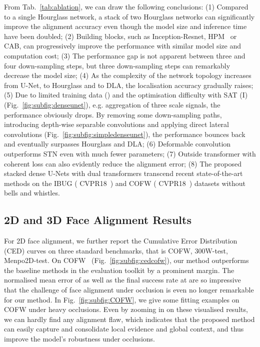 \documentclass{bmvc2k}
\begin{document}
From Tab.~\ref{tab:ablation}, we can draw the following conclusions: (1) Compared to a single Hourglass network, a stack of two Hourglass networks can significantly improve the alignment accuracy even though the model size and inference time have been doubled; (2) Building blocks, such as Inception-Resnet, HPM~\cite{bulat2017far} or CAB, can progressively improve the performance with similar model size and computation cost; (3) The performance gap is not apparent between three and four down-sampling steps, but three down-sampling steps can remarkably decrease the model size; (4) As the complexity of the network topology increases from U-Net, to Hourglass and to DLA, the localisation accuracy gradually raises; (5) Due to limited training data () and the optimisation difficulty with SAT (I) (Fig.~\ref{fig:subfig:denseunet}), e.g. aggregation of three scale signals, the performance obviously drops. By removing some down-sampling paths, introducing depth-wise separable convolutions and applying direct lateral convolutions (Fig.~\ref{fig:subfig:simpledenseunet}), the performance bounces back and eventually surpasses Hourglass and DLA; (6) Deformable convolution outperforms STN even with much fewer parameters; (7) Outside transformer with coherent loss can also evidently reduce the alignment error; (8) The proposed stacked dense U-Nets with dual transformers transcend recent state-of-the-art methods on the IBUG ( CVPR18~\cite{feng2017wing}) and COFW ( CVPR18~\cite{kumar2018disentangling}) datasets without bells and whistles.

\subsection{2D and 3D Face Alignment Results}

For 2D face alignment, we further report the Cumulative Error Distribution (CED) curves on three standard benchmarks, that is COFW, 300W-test, Menpo2D-test. On COFW~\cite{burgos2013robust} (Fig.~\ref{fig:subfig:cedcofw}), our method outperforms the baseline methods in the evaluation toolkit by a prominent margin. The normalised mean error of  as well as the final success rate at  are so impressive that the challenge of face alignment under occlusion is even no longer remarkable for our method. In Fig.~\ref{fig:subfig:COFW}, we give some fitting examples on COFW under heavy occlusions. Even by zooming in on these visualised results, we can hardly find any alignment flaw, which indicates that the proposed method can easily capture and consolidate local evidence and global context, and thus improve the model's robustness under occlusions.
\end{document}
